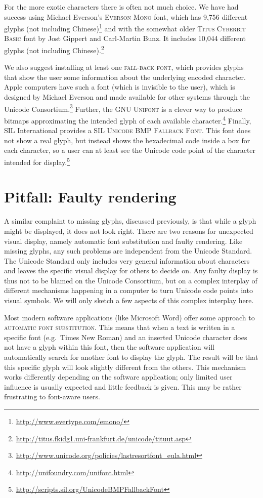 For the more exotic characters there is often not much choice. We have had success using 
Michael Everson's \textsc{Everson Mono} font, which has 9,756 different glyphs (not including 
Chinese)\footnote{\url{http://www.evertype.com/emono/}} and with the somewhat older \textsc{Titus Cyberbit Basic} font 
by Jost Gippert and Carl-Martin Bunz. It includes 10,044 different glyphs (not including 
Chinese).\footnote{\url{http://titus.fkidg1.uni-frankfurt.de/unicode/tituut.asp}} 

We also suggest installing at least one \textsc{fall-back
font}, which provides glyphs that show the user some information about
the underlying encoded character. Apple computers have such a font (which is
invisible to the user), which is designed by Michael Everson and made available
for other systems through the Unicode Consortium.\footnote{
\url{http://www.unicode.org/policies/lastresortfont\_eula.html}} Further, the
\textsc{GNU Unifont} is a clever way to produce bitmaps approximating the
intended glyph of each available character.\footnote{\url{http://unifoundry.com/unifont.html}} Finally,
SIL International provides a \textsc{SIL Unicode BMP Fallback
Font}. This font does not show a real 
glyph, but instead shows the hexadecimal code inside a box
for each character, so a user can at least see the Unicode code point of the
character intended for display.\footnote{\url{http://scripts.sil.org/UnicodeBMPFallbackFont}}

\section{Pitfall: Faulty rendering}
\label{pitfall-faulty-rendering}

A similar complaint to missing glyphs, discussed previously, is that while 
a glyph might be displayed, it does not look right. There are two
reasons for unexpected visual display, namely automatic font substitution and
faulty rendering. Like missing glyphs, any such problems are independent from
the Unicode Standard. The Unicode Standard only includes very general
information about characters and leaves the specific visual display for others to
decide on. Any faulty display is thus not to be blamed on the Unicode
Consortium, but on a complex interplay of different mechanisms happening in a
computer to turn Unicode code points into visual symbols. We will only sketch a
few aspects of this complex interplay here.

Most modern software applications (like Microsoft Word) offer some approach to
\textsc{automatic font substitution}. This means that when a text is written in
a specific font (e.g.~Times New Roman) and an inserted Unicode character does not
have a glyph within this font, then the software application will automatically
search for another font to display the glyph. The result will be that this
specific glyph will look slightly different from the others. This mechanism
works differently depending on the software application; only limited
user influence is usually expected and little feedback is given. This may be rather
frustrating to font-aware users.

